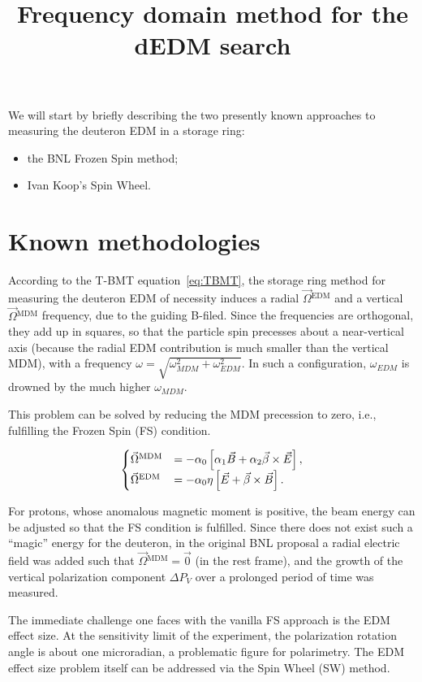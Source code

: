 \documentclass{article}
\newcommand{\W}{\Omega}
\newcommand{\w}{\omega}
\newcommand{\MDM}{{}^\mathrm{MDM}}
\newcommand{\EDM}{{}^\mathrm{EDM}}
\begin{document}
\title{Frequency domain method for the dEDM search}
We will start by briefly describing the two presently known approaches to measuring the deuteron EDM in a storage ring:
\begin{itemize}
\item the BNL Frozen Spin method;
\item Ivan Koop's Spin Wheel.
\end{itemize}

\section{Known methodologies}
According to the T-BMT equation~\eqref{eq:TBMT}, the storage ring method for measuring the deuteron EDM of necessity induces a radial $\vec\W\EDM$ and a vertical $\vec\W\MDM$ frequency, due to the guiding B-filed. Since the frequencies are orthogonal, they add up in squares, so that the particle spin precesses about a near-vertical axis (because the radial EDM contribution is much smaller than the vertical MDM), with a frequency $\w  = \sqrt{\w_{MDM}^2 + \w_{EDM}^2}$. In such a configuration, $\w_{EDM}$ is drowned by the much higher $\w_{MDM}$.

This problem can be solved by reducing the MDM precession to zero, i.e., fulfilling the Frozen Spin (FS) condition.

\begin{equation}\label{eq:TBMT}
  \begin{cases}
    \vec\W\MDM &= -\alpha_0\bkt*{\alpha_1\vec B + \alpha_2\vec\beta\times\vec E}, \\
    \vec\W\EDM &= -\alpha_0\eta\bkt*{\vec E + \vec\beta\times\vec B}.
  \end{cases}
\end{equation}

For protons, whose anomalous magnetic moment is positive, the beam energy can be adjusted so that the FS condition is fulfilled. Since there does not exist such a ``magic'' energy for the deuteron, in the original BNL proposal a radial electric field was added such that $\vec\W\MDM = \vec 0$ (in the rest frame), and the growth of the vertical polarization component $\Delta P_V$ over a prolonged period of time was measured.~\cite{BNL_proposal}

The immediate challenge one faces with the vanilla FS approach is the EDM effect size. At the sensitivity limit of the experiment, the polarization rotation angle is about one microradian, a problematic figure for polarimetry. The EDM effect size problem itself can be addressed via the Spin Wheel (SW) method.~\cite{Mane:SpinWheel}
\end{document}
